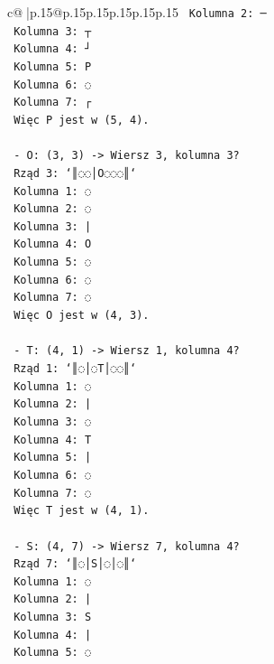 \documentclass{article}
\begin{document}
{\begin{supertabular}{c@{$\;$}|p{.15\linewidth}@{}p{.15\linewidth}p{.15\linewidth}p{.15\linewidth}p{.15\linewidth}p{.15\linewidth}}
{{{\texttt{    Kolumna 2: ─} \\
\texttt{    Kolumna 3: ┬} \\
\texttt{    Kolumna 4: ┘} \\
\texttt{    Kolumna 5: P} \\
\texttt{    Kolumna 6: ◌} \\
\texttt{    Kolumna 7: ┌} \\
\texttt{    Więc P jest w (5, 4).} \\
\\ 
\texttt{  {-} O: (3, 3) {-}> Wiersz 3, kolumna 3?} \\
\texttt{    Rząd 3: `║◌◌│O◌◌◌║`} \\
\texttt{    Kolumna 1: ◌} \\
\texttt{    Kolumna 2: ◌} \\
\texttt{    Kolumna 3: |} \\
\texttt{    Kolumna 4: O} \\
\texttt{    Kolumna 5: ◌} \\
\texttt{    Kolumna 6: ◌} \\
\texttt{    Kolumna 7: ◌} \\
\texttt{    Więc O jest w (4, 3).} \\
\\ 
\texttt{  {-} T: (4, 1) {-}> Wiersz 1, kolumna 4?} \\
\texttt{    Rząd 1: `║◌│◌T│◌◌║`} \\
\texttt{    Kolumna 1: ◌} \\
\texttt{    Kolumna 2: |} \\
\texttt{    Kolumna 3: ◌} \\
\texttt{    Kolumna 4: T} \\
\texttt{    Kolumna 5: |} \\
\texttt{    Kolumna 6: ◌} \\
\texttt{    Kolumna 7: ◌} \\
\texttt{    Więc T jest w (4, 1).} \\
\\ 
\texttt{  {-} S: (4, 7) {-}> Wiersz 7, kolumna 4?} \\
\texttt{    Rząd 7: `║◌│S│◌│◌║`} \\
\texttt{    Kolumna 1: ◌} \\
\texttt{    Kolumna 2: |} \\
\texttt{    Kolumna 3: S} \\
\texttt{    Kolumna 4: |} \\
\texttt{    Kolumna 5: ◌} \\
}}}
\end{supertabular}}
\end{document}

